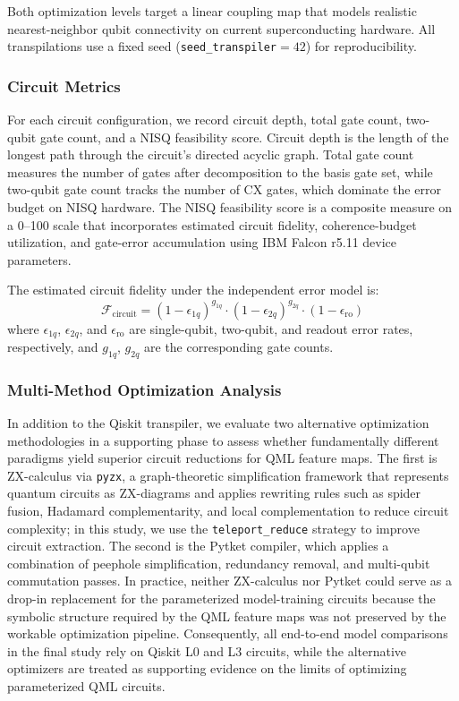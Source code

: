 \documentclass{ieeeaccess}
\begin{document}
Both optimization levels target a linear coupling map that models realistic nearest-neighbor qubit connectivity on current superconducting hardware. All transpilations use a fixed seed (\texttt{seed\_transpiler}$= 42$) for reproducibility.

\subsubsection{Circuit Metrics}
For each circuit configuration, we record circuit depth, total gate count, two-qubit gate count, and a NISQ feasibility score. Circuit depth is the length of the longest path through the circuit's directed acyclic graph. Total gate count measures the number of gates after decomposition to the basis gate set, while two-qubit gate count tracks the number of $\text{CX}$ gates, which dominate the error budget on NISQ hardware. The NISQ feasibility score is a composite measure on a 0--100 scale that incorporates estimated circuit fidelity, coherence-budget utilization, and gate-error accumulation using IBM Falcon r5.11 device parameters.

The estimated circuit fidelity under the independent error model is:
\begin{equation}
\mathcal{F}_{\text{circuit}} = (1 - \epsilon_{1q})^{g_{1q}} \cdot (1 - \epsilon_{2q})^{g_{2q}} \cdot (1 - \epsilon_{\text{ro}})
\label{eq:fidelity}
\end{equation}
where $\epsilon_{1q}$, $\epsilon_{2q}$, and $\epsilon_{\text{ro}}$ are single-qubit, two-qubit, and readout error rates, respectively, and $g_{1q}$, $g_{2q}$ are the corresponding gate counts.

\subsubsection{Multi-Method Optimization Analysis}
In addition to the Qiskit transpiler, we evaluate two alternative optimization methodologies in a supporting phase to assess whether fundamentally different paradigms yield superior circuit reductions for QML feature maps. The first is ZX-calculus via \texttt{pyzx}, a graph-theoretic simplification framework that represents quantum circuits as ZX-diagrams and applies rewriting rules such as spider fusion, Hadamard complementarity, and local complementation to reduce circuit complexity; in this study, we use the \texttt{teleport\_reduce} strategy to improve circuit extraction. The second is the Pytket compiler, which applies a combination of peephole simplification, redundancy removal, and multi-qubit commutation passes. In practice, neither ZX-calculus nor Pytket could serve as a drop-in replacement for the parameterized model-training circuits because the symbolic structure required by the QML feature maps was not preserved by the workable optimization pipeline. Consequently, all end-to-end model comparisons in the final study rely on Qiskit L0 and L3 circuits, while the alternative optimizers are treated as supporting evidence on the limits of optimizing parameterized QML circuits.
\end{document}
